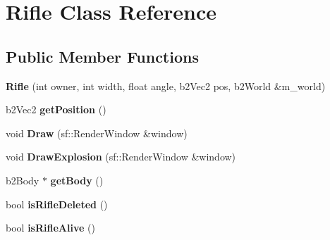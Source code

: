 \hypertarget{class_rifle}{}\section{Rifle Class Reference}
\label{class_rifle}
\subsection*{Public Member Functions}
\begin{DoxyCompactItemize}
\item 
{\bfseries Rifle} (int owner, int width, float angle, b2\+Vec2 pos, b2\+World \&m\+\_\+world)\hypertarget{class_rifle_a791f8551bfbd4f118523aebadbe7f26d}{}\label{class_rifle_a791f8551bfbd4f118523aebadbe7f26d}

\item 
b2\+Vec2 {\bfseries get\+Position} ()\hypertarget{class_rifle_a34c181fc3e7cbe2c9da4c110c0f278ff}{}\label{class_rifle_a34c181fc3e7cbe2c9da4c110c0f278ff}

\item 
void {\bfseries Draw} (sf\+::\+Render\+Window \&window)\hypertarget{class_rifle_ae7433a47fb7435e7b8bbc1464a2b22ad}{}\label{class_rifle_ae7433a47fb7435e7b8bbc1464a2b22ad}

\item 
void {\bfseries Draw\+Explosion} (sf\+::\+Render\+Window \&window)\hypertarget{class_rifle_a7dfab22169fe39fe1e373e6f4f747311}{}\label{class_rifle_a7dfab22169fe39fe1e373e6f4f747311}

\item 
b2\+Body $\ast$ {\bfseries get\+Body} ()\hypertarget{class_rifle_ace554da081255466d9a0875d7130f767}{}\label{class_rifle_ace554da081255466d9a0875d7130f767}

\item 
bool {\bfseries is\+Rifle\+Deleted} ()\hypertarget{class_rifle_a57059716322ee606b1792a549152c930}{}\label{class_rifle_a57059716322ee606b1792a549152c930}

\item 
bool {\bfseries is\+Rifle\+Alive} ()\hypertarget{class_rifle_ab932a5c4dc56aa0da669cd2e076bc632}{}\label{class_rifle_ab932a5c4dc56aa0da669cd2e076bc632}

\end{DoxyCompactItemize}
